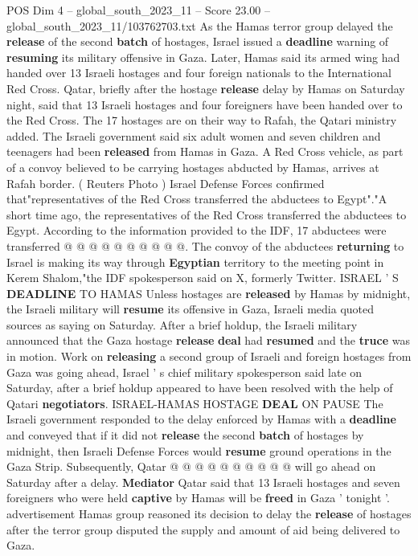 \begin{textsample}{POS Dim 4 – global\_south\_2023\_11 – Score 23.00 – global\_south\_2023\_11/103762703.txt}  \label{ex:f4_pos_151}
As the Hamas terror group delayed the \textbf{release} of the second \textbf{batch} of hostages, Israel issued a \textbf{deadline} warning of \textbf{resuming} its military offensive in Gaza.
Later, Hamas said its armed wing had handed over 13 Israeli hostages and four foreign nationals to the International Red Cross.
Qatar, briefly after the hostage \textbf{release} delay by Hamas on Saturday night, said that 13 Israeli hostages and four foreigners have been handed over to the Red Cross.
The 17 hostages are on their way to Rafah, the Qatari ministry added.
The Israeli government said six adult women and seven children and teenagers had been \textbf{released} from Hamas in Gaza.
A Red Cross vehicle, as part of a convoy believed to be carrying hostages abducted by Hamas, arrives at Rafah border. ( Reuters Photo ) Israel Defense Forces confirmed that"representatives of the Red Cross transferred the abductees to Egypt"."A short time ago, the representatives of the Red Cross transferred the abductees to Egypt.
According to the information provided to the IDF, 17 abductees were transferred @ @ @ @ @ @ @ @ @ @.
The convoy of the abductees \textbf{returning} to Israel is making its way through \textbf{Egyptian} territory to the meeting point in Kerem Shalom,"the IDF spokesperson said on X, formerly Twitter.
ISRAEL ' S \textbf{DEADLINE} TO HAMAS Unless hostages are \textbf{released} by Hamas by midnight, the Israeli military will \textbf{resume} its offensive in Gaza, Israeli media quoted sources as saying on Saturday.
After a brief holdup, the Israeli military announced that the Gaza hostage \textbf{release} \textbf{deal} had \textbf{resumed} and the \textbf{truce} was in motion.
Work on \textbf{releasing} a second group of Israeli and foreign hostages from Gaza was going ahead, Israel ' s chief military spokesperson said late on Saturday, after a brief holdup appeared to have been resolved with the help of Qatari \textbf{negotiators}.
ISRAEL-HAMAS HOSTAGE \textbf{DEAL} ON PAUSE The Israeli government responded to the delay enforced by Hamas with a \textbf{deadline} and conveyed that if it did not \textbf{release} the second \textbf{batch} of hostages by midnight, then Israeli Defense Forces would \textbf{resume} ground operations in the Gaza Strip.
Subsequently, Qatar @ @ @ @ @ @ @ @ @ @ will go ahead on Saturday after a delay. \textbf{Mediator} Qatar said that 13 Israeli hostages and seven foreigners who were held \textbf{captive} by Hamas will be \textbf{freed} in Gaza ' tonight '. advertisement Hamas group reasoned its decision to delay the \textbf{release} of hostages after the terror group disputed the supply and amount of aid being delivered to Gaza.

\end{textsample}
